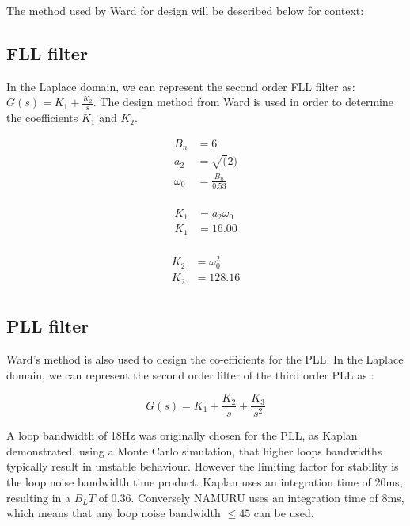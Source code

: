 The method used by Ward for design will be described below for context: 

\subsection{\ac{FLL} filter}
In the Laplace domain, we can represent the second order \ac{FLL} filter as:  $G(s) = K_1 + \frac{K_2}{s}$. The design method from Ward \cite{Ward} is used in order to determine the coefficients $K_1$ and $K_2$.  

\begin{align*}
B_n &= 6\\
a_2 &= \sqrt(2)\\
\omega_{0}&=\frac{B_n}{0.53}\\
\end{align*}

\begin{equation} \label{eq1}
\begin{split}
K_1 & = a_2 \omega_{0}\\
K_1 & = 16.00\\
\end{split}
\end{equation}

\begin{equation} \label{eq2}
\begin{split}
K_2 & = \omega_{0}^2\\
K_2 & = 128.16\\
\end{split}
\end{equation}

\subsection{\ac{PLL} filter}
Ward's method is also used to design the co-efficients for the \ac{PLL}. In the Laplace domain, we can represent the second order filter  of the third order \ac{PLL} as : 

\begin{equation} \label{eq6}
G(s) = K_1 + \frac{K_2}{s} + \frac{K_3}{s^2}
\end{equation}

A loop bandwidth of 18Hz was originally chosen for the \ac{PLL}, as Kaplan\cite{Kaplan} demonstrated, using a Monte Carlo simulation, that higher loops bandwidths typically result in unstable behaviour. However the limiting factor for stability is the loop noise bandwidth time product. Kaplan uses an integration time of 20ms, resulting in a $B_LT$ of 0.36. Conversely \ac{NAMURU} uses an integration time of 8ms, which means that any loop noise bandwidth $\leq 45$ can be used. 


